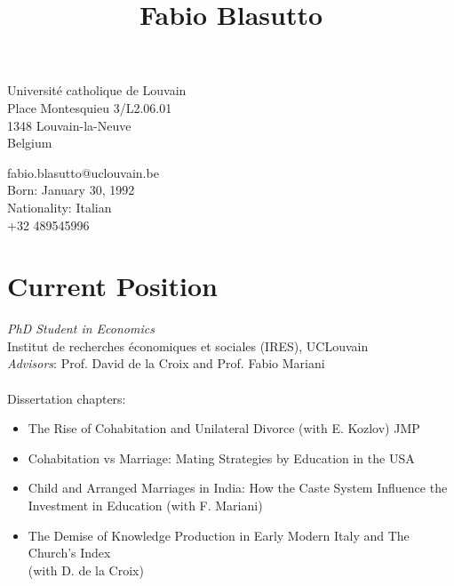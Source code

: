 \documentclass[10pt]{article} %
\begin{document}
\begin{center}
\title{Fabio Blasutto} %
\end{center}

\pagestyle{empty}
\parbox{0.5\textwidth}{ %
 Université catholique de Louvain\\ %
 Place Montesquieu 3/L2.06.01\\ %
 1348 Louvain-la-Neuve\\ %
 Belgium %
}
\hfill %
\parbox[left]{0.5\textwidth}{\raggedleft 

fabio.blasutto@uclouvain.be \\ %
Born: January 30, 1992 \\
Nationality: Italian \\
+32 489545996  
}
\vspace{0.4cm}
\section{Current Position}
\textit{PhD Student in Economics}\\
Institut de recherches économiques et sociales (IRES), UCLouvain \\
\textit{Advisors}: Prof. David de la Croix and Prof. Fabio Mariani\\
\vspace{0.2cm}\\
Dissertation chapters: 
\begin{itemize}
\item The Rise of Cohabitation and Unilateral Divorce
(with E. Kozlov) JMP
\item Cohabitation vs Marriage: Mating Strategies by Education in the USA
\item Child and Arranged Marriages in India: How the Caste System Influence the Investment in Education
(with F. Mariani)
\item The Demise of Knowledge Production in Early Modern Italy and The Church's Index\\
(with D. de la Croix)
\end{itemize}
\end{document}
